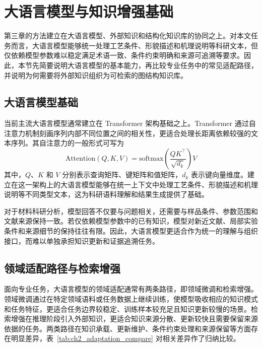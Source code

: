\section{大语言模型与知识增强基础}

第三章的方法建立在大语言模型、外部知识和结构化知识库的协同之上。对本文任务而言，大语言模型能够统一处理工艺条件、形貌描述和机理说明等科研文本，但仅依赖模型参数难以稳定满足术语一致、条件约束明确和来源可追溯等要求。因此，本节先简要说明大语言模型的基本能力，再比较专业任务中的常见适配路径，并说明为何需要将外部知识组织为可检索的图结构知识库。

\subsection{大语言模型基础}

当前主流大语言模型通常建立在 Transformer 架构基础之上\cite{Vaswani2017Attention}。Transformer 通过自注意力机制刻画序列内部不同位置之间的相关性，更适合处理长距离依赖较强的文本序列。其自注意力的一般形式可写为
\begin{equation}
    \mathrm{Attention}(Q,K,V)=\mathrm{softmax}\left(\frac{QK^{\top}}{\sqrt{d_k}}\right)V
\end{equation}
其中，$Q$、$K$ 和 $V$ 分别表示查询矩阵、键矩阵和值矩阵，$d_k$ 表示键向量维度。建立在这一架构上的大语言模型能够在统一上下文中处理工艺条件、形貌描述和机理说明等不同类型文本，这为科研语料理解和结果生成提供了基础。

对于材料科研分析，模型回答不仅要与问题相关，还需要与样品条件、参数范围和文献来源保持一致。若仅依赖模型参数中的已有知识，模型对新近文献、局部实验条件和来源细节的保持往往有限\cite{Choi2024,Jiang2025}。因此，大语言模型更适合作为统一的理解与组织接口，而难以单独承担知识更新和证据追溯任务。

\subsection{领域适配路径与检索增强}

面向专业任务，大语言模型的领域适配通常有两条路径，即领域微调和检索增强。领域微调通过在特定领域语料或任务数据上继续训练，使模型吸收相应的知识模式和任务特征，更适合任务边界较稳定、训练样本较充足且知识更新较慢的场景。检索增强在推理阶段引入外部知识，更适合知识来源分散、更新较快且需要保留来源依据的任务。两类路径在知识承载、更新维护、条件约束处理和来源保留等方面存在明显差异，表~\ref{tab:ch2_adaptation_compare} 对相关差异作了归纳比较\cite{Soudani2024,lewis2020rag,Mostafa2024}。


